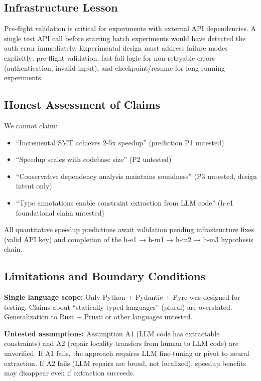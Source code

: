 \subsection{Infrastructure Lesson}

Pre-flight validation is critical for experiments with external API dependencies. A single test API call before starting batch experiments would have detected the auth error immediately. Experimental design must address failure modes explicitly: pre-flight validation, fast-fail logic for non-retryable errors (authentication, invalid input), and checkpoint/resume for long-running experiments.

\subsection{Honest Assessment of Claims}

We cannot claim:
\begin{itemize}
\item ``Incremental SMT achieves 2-5x speedup'' (prediction P1 untested)
\item ``Speedup scales with codebase size'' (P2 untested)
\item ``Conservative dependency analysis maintains soundness'' (P3 untested, design intent only)
\item ``Type annotations enable constraint extraction from LLM code'' (h-e1 foundational claim untested)
\end{itemize}

All quantitative speedup predictions await validation pending infrastructure fixes (valid API key) and completion of the h-e1 → h-m1 → h-m2 → h-m3 hypothesis chain.

\subsection{Limitations and Boundary Conditions}

\textbf{Single language scope:} Only Python + Pydantic + Pyre was designed for testing. Claims about ``statically-typed languages'' (plural) are overstated. Generalization to Rust + Prusti or other languages untested.

\textbf{Untested assumptions:} Assumption A1 (LLM code has extractable constraints) and A2 (repair locality transfers from human to LLM code) are unverified. If A1 fails, the approach requires LLM fine-tuning or pivot to neural extraction. If A2 fails (LLM repairs are broad, not localized), speedup benefits may disappear even if extraction succeeds.

